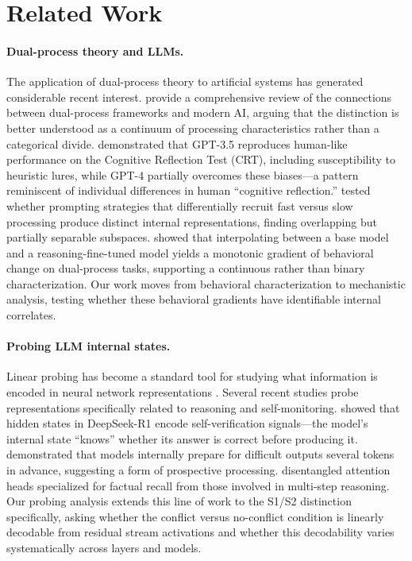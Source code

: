 
\section{Related Work}
\label{sec:related_work}

\paragraph{Dual-process theory and LLMs.}
The application of dual-process theory to artificial systems has generated
considerable recent interest.  \citet{lampinen2025nature} provide a
comprehensive review of the connections between dual-process frameworks and
modern AI, arguing that the distinction is better understood as a continuum of
processing characteristics rather than a categorical divide.
\citet{hagendorff2023human} demonstrated that GPT-3.5 reproduces human-like
performance on the Cognitive Reflection Test (CRT), including susceptibility to
heuristic lures, while GPT-4 partially overcomes these biases---a pattern
reminiscent of individual differences in human ``cognitive reflection.''
\citet{codaforno2025dual} tested whether prompting strategies that differentially
recruit fast versus slow processing produce distinct internal representations,
finding overlapping but partially separable subspaces.
\citet{ziabari2025reasoning} showed that interpolating between a base model and
a reasoning-fine-tuned model yields a monotonic gradient of behavioral change on
dual-process tasks, supporting a continuous rather than binary characterization.
Our work moves from behavioral characterization to mechanistic analysis,
testing whether these behavioral gradients have identifiable internal
correlates.

\paragraph{Probing LLM internal states.}
Linear probing has become a standard tool for studying what information is
encoded in neural network representations
\citep{hewitt2019control, burns2022discovering}.  Several recent studies probe
representations specifically related to reasoning and self-monitoring.
\citet{zhang2025probing} showed that hidden states in DeepSeek-R1 encode
self-verification signals---the model's internal state ``knows'' whether its
answer is correct before producing it.
\citet{afzal2025knowing} demonstrated that models internally prepare for
difficult outputs several tokens in advance, suggesting a form of prospective
processing.
\citet{fartale2025recall} disentangled attention heads specialized for factual
recall from those involved in multi-step reasoning.
Our probing analysis extends this line of work to the S1/S2 distinction
specifically, asking whether the conflict versus no-conflict condition is
linearly decodable from residual stream activations and whether this
decodability varies systematically across layers and models.

